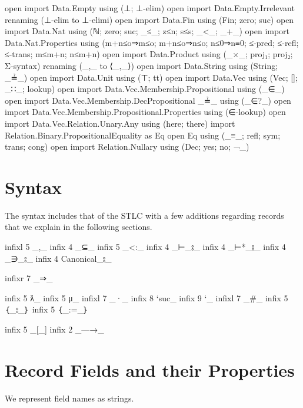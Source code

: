 \begin{fence}
\begin{code}
open import Data.Empty using (⊥; ⊥-elim)
open import Data.Empty.Irrelevant renaming (⊥-elim to ⊥-elimi)
open import Data.Fin using (Fin; zero; suc)
open import Data.Nat using (ℕ; zero; suc; _≤_; z≤n; s≤s; _<_; _+_)
open import Data.Nat.Properties
    using (m+n≤o⇒m≤o; m+n≤o⇒n≤o; n≤0⇒n≡0; ≤-pred; ≤-refl; ≤-trans; m≤m+n; n≤m+n)
open import Data.Product using (_×_; proj₁; proj₂; Σ-syntax) renaming (_,_ to ⟨_,_⟩)
open import Data.String using (String; _≟_)
open import Data.Unit using (⊤; tt)
open import Data.Vec using (Vec; []; _∷_; lookup)
open import Data.Vec.Membership.Propositional using (_∈_)
open import Data.Vec.Membership.DecPropositional _≟_ using (_∈?_)
open import Data.Vec.Membership.Propositional.Properties using (∈-lookup)
open import Data.Vec.Relation.Unary.Any using (here; there)
import Relation.Binary.PropositionalEquality as Eq
open Eq using (_≡_; refl; sym; trans; cong)
open import Relation.Nullary using (Dec; yes; no; ¬_)
\end{code}
\end{fence}

\hypertarget{syntax}{%
\section{Syntax}\label{syntax}}

The syntax includes that of the STLC with a few additions regarding
records that we explain in the following sections.

\begin{fence}
\begin{code}
infixl 5 _,_
infix 4 _⊆_
infix 5 _<:_
infix  4 _⊢_⦂_
infix 4 _⊢*_⦂_
infix  4 _∋_⦂_
infix  4 Canonical_⦂_

infixr 7 _⇒_

infix  5 ƛ_
infix  5 μ_
infixl 7 _·_
infix  8 `suc_
infix  9 `_
infixl 7 _#_
infix 5 ｛_⦂_｝
infix 5 ｛_:=_｝

infix 5 _[_]
infix 2 _—→_
\end{code}
\end{fence}

\hypertarget{record-fields-and-their-properties}{%
\section{Record Fields and their
Properties}\label{record-fields-and-their-properties}}

We represent field names as strings.

